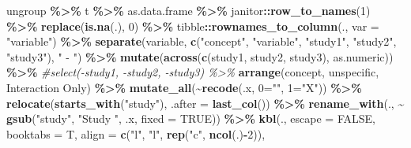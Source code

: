 \documentclass[
]{article}
\newenvironment{Shaded}{\begin{snugshade}}{\end{snugshade}}
\newcommand{\AttributeTok}[1]{\textcolor[rgb]{0.13,0.29,0.53}{#1}}
\newcommand{\CommentTok}[1]{\textcolor[rgb]{0.56,0.35,0.01}{\textit{#1}}}
\newcommand{\ConstantTok}[1]{\textcolor[rgb]{0.56,0.35,0.01}{#1}}
\newcommand{\DecValTok}[1]{\textcolor[rgb]{0.00,0.00,0.81}{#1}}
\newcommand{\FunctionTok}[1]{\textcolor[rgb]{0.13,0.29,0.53}{\textbf{#1}}}
\newcommand{\NormalTok}[1]{#1}
\newcommand{\OtherTok}[1]{\textcolor[rgb]{0.56,0.35,0.01}{#1}}
\newcommand{\SpecialCharTok}[1]{\textcolor[rgb]{0.81,0.36,0.00}{\textbf{#1}}}
\newcommand{\StringTok}[1]{\textcolor[rgb]{0.31,0.60,0.02}{#1}}
\begin{document}
\begin{Shaded}
\begin{Highlighting}[]
\NormalTok{  ungroup }\SpecialCharTok{\%\textgreater{}\%}
\NormalTok{  t }\SpecialCharTok{\%\textgreater{}\%}
\NormalTok{  as.data.frame }\SpecialCharTok{\%\textgreater{}\%}
\NormalTok{  janitor}\SpecialCharTok{::}\FunctionTok{row\_to\_names}\NormalTok{(}\DecValTok{1}\NormalTok{) }\SpecialCharTok{\%\textgreater{}\%}
  \FunctionTok{replace}\NormalTok{(}\FunctionTok{is.na}\NormalTok{(.), }\DecValTok{0}\NormalTok{) }\SpecialCharTok{\%\textgreater{}\%}
\NormalTok{  tibble}\SpecialCharTok{::}\FunctionTok{rownames\_to\_column}\NormalTok{(., }\AttributeTok{var =} \StringTok{"variable"}\NormalTok{) }\SpecialCharTok{\%\textgreater{}\%}
  \FunctionTok{separate}\NormalTok{(variable, }\FunctionTok{c}\NormalTok{(}\StringTok{"concept"}\NormalTok{, }\StringTok{"variable"}\NormalTok{, }\StringTok{"study1"}\NormalTok{, }\StringTok{"study2"}\NormalTok{, }\StringTok{"study3"}\NormalTok{), }\StringTok{" {-} "}\NormalTok{) }\SpecialCharTok{\%\textgreater{}\%}
  \FunctionTok{mutate}\NormalTok{(}\FunctionTok{across}\NormalTok{(}\FunctionTok{c}\NormalTok{(study1, study2, study3), as.numeric)) }\SpecialCharTok{\%\textgreater{}\%}
  \CommentTok{\#select({-}study1, {-}study2, {-}study3) \%\textgreater{}\%}
  \FunctionTok{arrange}\NormalTok{(concept, unspecific, }\StringTok{\textasciigrave{}}\AttributeTok{Interaction Only}\StringTok{\textasciigrave{}}\NormalTok{) }\SpecialCharTok{\%\textgreater{}\%} 
  \FunctionTok{mutate\_all}\NormalTok{(}\SpecialCharTok{\textasciitilde{}}\FunctionTok{recode}\NormalTok{(.x, }\StringTok{\textasciigrave{}}\AttributeTok{0}\StringTok{\textasciigrave{}}\OtherTok{=}\StringTok{""}\NormalTok{, }\StringTok{\textasciigrave{}}\AttributeTok{ 1}\StringTok{\textasciigrave{}}\OtherTok{=}\StringTok{"X"}\NormalTok{)) }\SpecialCharTok{\%\textgreater{}\%}
  \FunctionTok{relocate}\NormalTok{(}\FunctionTok{starts\_with}\NormalTok{(}\StringTok{"study"}\NormalTok{), }\AttributeTok{.after =} \FunctionTok{last\_col}\NormalTok{()) }\SpecialCharTok{\%\textgreater{}\%}
  \FunctionTok{rename\_with}\NormalTok{(., }\SpecialCharTok{\textasciitilde{}} \FunctionTok{gsub}\NormalTok{(}\StringTok{"study"}\NormalTok{, }\StringTok{"Study "}\NormalTok{, .x, }\AttributeTok{fixed =} \ConstantTok{TRUE}\NormalTok{)) }\SpecialCharTok{\%\textgreater{}\%}
  \FunctionTok{kbl}\NormalTok{(.,}
      \AttributeTok{escape =} \ConstantTok{FALSE}\NormalTok{,}
      \AttributeTok{booktabs =}\NormalTok{ T,}
      \AttributeTok{align =} \FunctionTok{c}\NormalTok{(}\StringTok{"l"}\NormalTok{, }\StringTok{"l"}\NormalTok{, }\FunctionTok{rep}\NormalTok{(}\StringTok{"c"}\NormalTok{, }\FunctionTok{ncol}\NormalTok{(.)}\SpecialCharTok{{-}}\DecValTok{2}\NormalTok{)),}

\end{Highlighting}
\end{Shaded}
\end{document}
